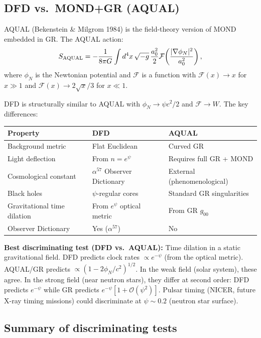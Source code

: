 \documentclass[11pt]{article}
\newcommand{\alphafine}{\alpha}
\begin{document}
\subsection{DFD vs.\ MOND+GR (AQUAL)}

AQUAL (Bekenstein \& Milgrom 1984) is the field-theory version of MOND
embedded in GR.  The AQUAL action:
\begin{equation}
  S_{\rm AQUAL} = -\frac{1}{8\pi G}\int d^4x\,\sqrt{-g}\,
  \frac{a_0^2}{2}\mathcal{F}\!\left(\frac{|\nabla\phi_N|^2}{a_0^2}\right),
\end{equation}
where $\phi_N$ is the Newtonian potential and $\mathcal{F}$ is a function
with $\mathcal{F}(x) \to x$ for $x \gg 1$ and $\mathcal{F}(x) \to 2\sqrt{x}/3$
for $x \ll 1$.

DFD is structurally similar to AQUAL with $\phi_N \to \psi c^2/2$ and
$\mathcal{F} \to W$.  The key differences:

\begin{center}
\begin{tabular}{lll}
\toprule
Property & DFD & AQUAL \\
\midrule
Background metric & Flat Euclidean & Curved GR \\
Light deflection & From $n = e^\psi$ & Requires full GR + MOND \\
Cosmological constant & $\alphafine^{57}$ Observer Dictionary & External (phenomenological) \\
Black holes & $\psi$-regular cores & Standard GR singularities \\
Gravitational time dilation & From $e^\psi$ optical metric & From GR $g_{00}$ \\
Observer Dictionary & Yes ($\alpha^{57}$) & No \\
\bottomrule
\end{tabular}
\end{center}

\textbf{Best discriminating test (DFD vs.\ AQUAL):} Time dilation in a
static gravitational field.  DFD predicts clock rates $\propto e^{-\psi}$
(from the optical metric).  AQUAL/GR predicts $\propto (1 - 2\phi_N/c^2)^{1/2}$.
In the weak field (solar system), these agree.  In the strong field
(near neutron stars), they differ at second order: DFD predicts $e^{-\psi}$
while GR predicts $e^{-\psi}[1 + \mathcal{O}(\psi^2)]$.  Pulsar timing
(NICER, future X-ray timing missions) could discriminate at $\psi \sim 0.2$
(neutron star surface).

\subsection{Summary of discriminating tests}
\end{document}
